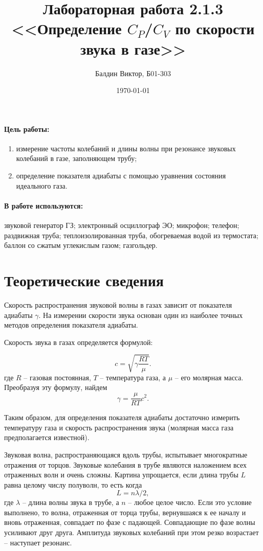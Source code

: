 \documentclass[a4paper,12pt]{article}
\title{
Лабораторная работа 2.1.3	\\
<<Определение $C_P$/$C_V$ по скорости звука в газе>>
}
\author{Балдин Виктор, Б01-303}
\date{\today}
\theoremstyle{definition}
\begin{document}
	\maketitle
	
	\paragraph{Цель работы:}  
	\begin{enumerate}
		\item измерение частоты колебаний и длины волны при резонансе звуковых колебаний в газе, заполняющем трубу;
		\item определение показателя адиабаты с помощью уравнения состояния идеального газа.
	\end{enumerate}
	
	\paragraph{В работе используются:} звуковой генератор ГЗ; электронный осциллограф ЭО; микрофон; телефон; раздвижная труба; теплоизолированная труба, обогреваемая водой из термостата; баллон со сжатым углекислым газом; газгольдер.
	
	\section{Теоретические сведения}
	
	Скорость распространения звуковой волны в газах зависит от показателя адиабаты $\gamma $. На измерении скорости звука основан один из наиболее точных методов определения показателя адиабаты.
	
	Скорость звука в газах определяется формулой:
	
	\begin{equation}
		c=\sqrt{\gamma\frac{RT}{\mu}}.
		\label{velocity}
	\end{equation}
	где $ R $ -- газовая постоянная, $ T $ -- температура газа, а $ \mu $ -- его молярная масса. Преобразуя эту формулу, найдем
	\begin{equation}\label{gamma}
		\gamma = \frac{\mu}{RT}c^2.
	\end{equation}
	
	Таким образом, для определения показателя адиабаты достаточно измерить температуру газа и скорость распространения звука (молярная масса газа предполагается известной).
	
	Звуковая волна, распространяющаяся вдоль трубы, испытывает многократные отражения от торцов. Звуковые колебания в трубе являются наложением всех отраженных волн и очень сложны. Картина упрощается, если длина трубы $ L $ равна целому числу полуволн, то есть когда \[ L=n\lambda/2, \] где $ \lambda $ -- длина волны звука в трубе, а $ n $ -- любое целое число. Если это условие выполнено, то волна, отраженная от торца трубы, вернувшаяся к ее началу и вновь отраженная, совпадает по фазе с падающей. Совпадающие по фазе волны усиливают друг друга. Амплитуда звуковых колебаний при этом резко возрастает -- наступает резонанс.
	
\end{document}

